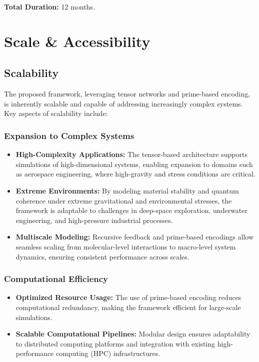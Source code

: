 \documentclass{article}
\theoremstyle{plain}
\begin{document}
\textbf{Total Duration:} 12 months.
\section{Scale \& Accessibility}

\subsection{Scalability}
The proposed framework, leveraging tensor networks and prime-based encoding, is inherently scalable and capable of addressing increasingly complex systems. Key aspects of scalability include:

\subsubsection{Expansion to Complex Systems}
\begin{itemize}
    \item \textbf{High-Complexity Applications:} The tensor-based architecture supports simulations of high-dimensional systems, enabling expansion to domains such as aerospace engineering, where high-gravity and stress conditions are critical.
    \item \textbf{Extreme Environments:} By modeling material stability and quantum coherence under extreme gravitational and environmental stresses, the framework is adaptable to challenges in deep-space exploration, underwater engineering, and high-pressure industrial processes.
    \item \textbf{Multiscale Modeling:} Recursive feedback and prime-based encodings allow seamless scaling from molecular-level interactions to macro-level system dynamics, ensuring consistent performance across scales.
\end{itemize}

\subsubsection{Computational Efficiency}
\begin{itemize}
    \item \textbf{Optimized Resource Usage:} The use of prime-based encoding reduces computational redundancy, making the framework efficient for large-scale simulations.
    \item \textbf{Scalable Computational Pipelines:} Modular design ensures adaptability to distributed computing platforms and integration with existing high-performance computing (HPC) infrastructures.
\end{itemize}
\end{document}
